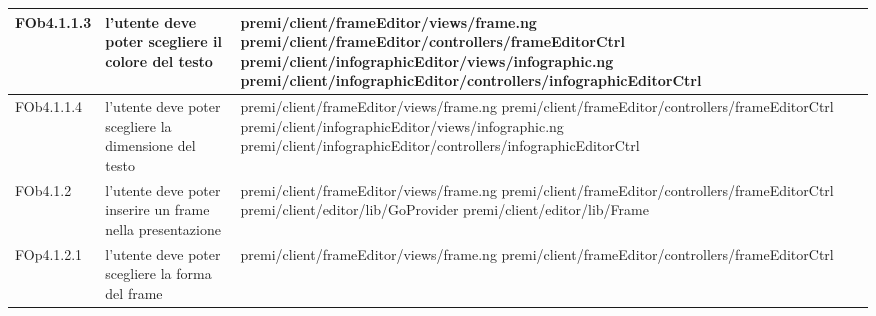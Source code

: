 \begin{longtable}{|l|p{5cm}|p{7cm}|}
\hline
FOb4.1.1.3 & l'utente deve poter scegliere il colore del testo & \hspace{0pt}premi/client/frameEditor/views/frame.ng \linebreak \linebreak premi/client/frameEditor/controllers/frameEditorCtrl \linebreak \linebreak premi/client/infographicEditor/views/infographic.ng \linebreak \linebreak premi/client/infographicEditor/controllers/infographicEditorCtrl \\
\hline
FOb4.1.1.4 & l'utente deve poter scegliere la dimensione del testo & \hspace{0pt}premi/client/frameEditor/views/frame.ng \linebreak \linebreak premi/client/frameEditor/controllers/frameEditorCtrl \linebreak \linebreak premi/client/infographicEditor/views/infographic.ng \linebreak \linebreak premi/client/infographicEditor/controllers/infographicEditorCtrl \\
\hline
FOb4.1.2 & l'utente deve poter inserire un frame nella presentazione & \hspace{0pt}premi/client/frameEditor/views/frame.ng \linebreak \linebreak premi/client/frameEditor/controllers/frameEditorCtrl \linebreak \linebreak premi/client/editor/lib/GoProvider \linebreak \linebreak premi/client/editor/lib/Frame \\
\hline
FOp4.1.2.1 & l'utente deve poter scegliere la forma del frame & \hspace{0pt}premi/client/frameEditor/views/frame.ng \linebreak \linebreak premi/client/frameEditor/controllers/frameEditorCtrl \\
\hline

\end{longtable}
